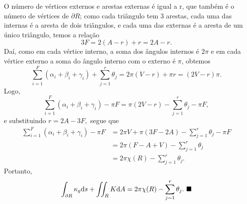 \documentclass[../differential_geometry.tex]{subfiles}
\begin{document}
O número de vértices externos e arestas externas é igual a r, que também é o número de vértices de \(\partial R\); como cada triângulo tem 3 arestas, cada uma das internas é a aresta de dois triângulos, e cada uma das externas é a aresta de um único triângulo, temos a relação
\[
	3F = 2(A-r) + r = 2A - r.
\]
Daí, como em cada vértice interno, a soma dos ângulos internos é \(2\pi \) e em cada vértice externo a soma do ângulo interno com o externo é \(\pi \), obtemos
\[
	\sum\limits_{i=1}^{F}(\alpha_{i}+\beta_{i}+\gamma_{i}) + \sum\limits_{j=1}^{r}\theta_{j}=2\pi (V-r) + \pi r = (2V-r) \pi.
\]
Logo,
\[
	\sum\limits_{i=1}^{F}(\alpha_{i}+\beta_{i}+\gamma_{i}) - \pi F = \pi (2V-r) - \sum\limits_{j=1}^{r}\theta_{j}-\pi F,
\]
e substituindo \(r=2A - 3F,\) segue que
\begin{align*}
	\sum\limits_{i=1}^{F}(\alpha_{i}+\beta_{i}+\gamma_{i}) - \pi F & = 2\pi V + \pi (3F-2A) - \sum\limits_{j=1}^{r}\theta_{j}-\pi F \\
	                                                               & = 2\pi (F-A+V)-\sum\limits_{j=1}^{r}\theta_{j}                 \\
	                                                               & = 2\pi \chi (R) - \sum\limits_{j=1}^{r}\theta_{j}.
\end{align*}
Portanto,
\[
	\int_{\partial R}^{}\kappa_g \mathrm{d}s + \iint_{R}K \mathrm{d}A=2\pi \chi (R) - \sum\limits_{j=1}^{r}\theta_{j}. \text{ $\blacksquare$}
\]
\end{document}
